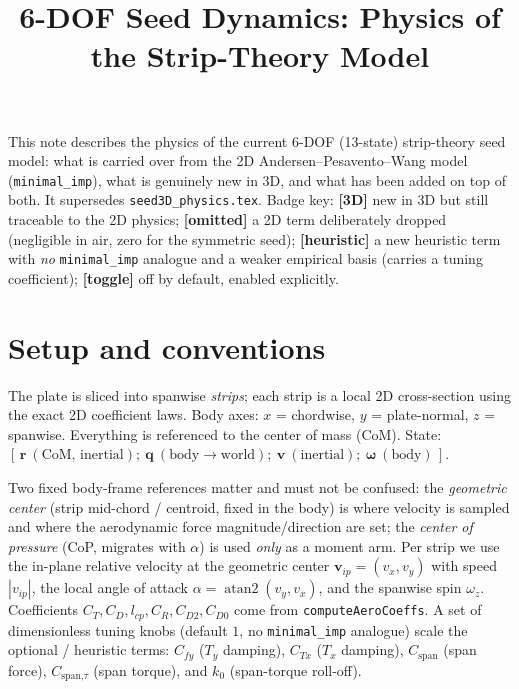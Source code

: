 \documentclass[11pt]{article}
\title{\vspace{-1.5em}6-DOF Seed Dynamics: Physics of the Strip-Theory Model}
\author{}
\date{}
\newcommand{\newin}{{\small\textbf{\color{blue}[3D]}}}          %
\newcommand{\drop}{{\small\textbf{\color{red!70!black}[omitted]}}} %
\newcommand{\heur}{{\small\textbf{\color{teal}[heuristic]}}}     %
\newcommand{\opt}{{\small\textbf{\color{orange!80!black}[toggle]}}} %
\begin{document}
\maketitle
\vspace{-3em}

This note describes the physics of the current 6-DOF (13-state) strip-theory seed
model: what is carried over from the 2D Andersen--Pesavento--Wang model
(\texttt{minimal\_imp}), what is genuinely new in 3D, and what has been added on top
of both. It supersedes \texttt{seed3D\_physics.tex}. Badge key:
\newin{} new in 3D but still traceable to the 2D physics;
\drop{} a 2D term deliberately dropped (negligible in air, zero for the symmetric seed);
\heur{} a new heuristic term with \emph{no} \texttt{minimal\_imp} analogue and a weaker
empirical basis (carries a tuning coefficient);
\opt{} off by default, enabled explicitly.

\section*{Setup and conventions}
The plate is sliced into spanwise \emph{strips}; each strip is a local 2D
cross-section using the exact 2D coefficient laws. Body axes: $x$ = chordwise,
$y$ = plate-normal, $z$ = spanwise. Everything is referenced to the center of
mass (CoM). State: $[\,\mathbf{r}\ (\text{CoM, inertial});\ \mathbf{q}\ (\text{body}\to\text{world});\ \mathbf{v}\ (\text{inertial});\ \boldsymbol{\omega}\ (\text{body})\,]$.

Two fixed body-frame references matter and must not be confused:
the \emph{geometric center} (strip mid-chord / centroid, fixed in the body) is where
velocity is sampled and where the aerodynamic force magnitude/direction are set; the
\emph{center of pressure} (CoP, migrates with $\alpha$) is used \emph{only} as a
moment arm. Per strip we use the in-plane relative velocity at the geometric center
$\mathbf{v}_{ip}=(v_x,v_y)$ with speed $|v_{ip}|$, the local angle of attack
$\alpha=\operatorname{atan2}(v_y,v_x)$, and the spanwise spin $\omega_z$. Coefficients
$C_T,C_D,l_{cp},C_R,C_{D2},C_{D0}$ come from \texttt{computeAeroCoeffs}. A set of
dimensionless tuning knobs (default $1$, no \texttt{minimal\_imp} analogue) scale the
optional / heuristic terms: $C_{fy}$ ($T_y$ damping), $C_{Tx}$ ($T_x$ damping),
$C_{\text{span}}$ (span force), $C_{\text{span,}\tau}$ (span torque), and $k_0$
(span-torque roll-off).
\end{document}
